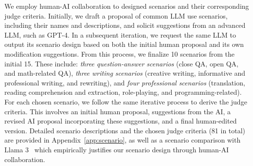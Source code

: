 We employ human-AI collaboration to designed scenarios and their corresponding judge criteria. 
Initially, we draft a proposal of common LLM use scenarios, including their names and descriptions, and solicit suggestions from an advanced LLM, such as GPT-4. In a subsequent iteration, we request the same LLM to output its scenario design based on both the initial human proposal and its own modification suggestions. From this process, we finalize 10 scenarios from the initial 15. These include: \textit{three question-answer scenarios} (close QA, open QA, and math-related QA), \textit{three writing scenarios} (creative writing, informative and professional writing, and rewriting), and \textit{four professional scenarios} (translation, reading comprehension and extraction, role-playing, and programming-related).
For each chosen scenario, we follow the same iterative process to derive the judge criteria. This involves an initial human proposal, suggestions from the AI, a revised AI proposal incorporating these suggestions, and a final human-edited version. Detailed scenario descriptions and the chosen judge criteria (81 in total) are provided in Appendix~\ref{app:scenario}, as well as a scenario comparison with Llama 3~\cite{llama3tech} which empirically justifies our scenario design through human-AI collaboration.





